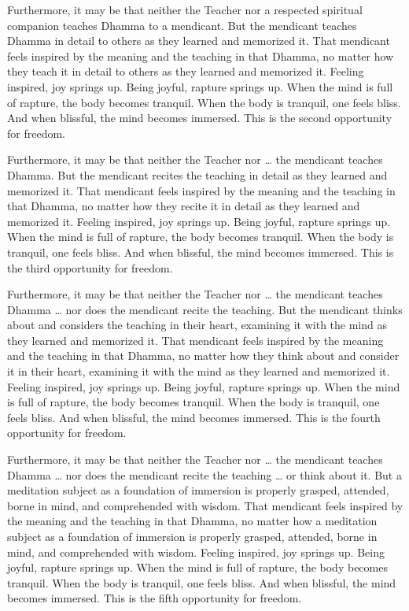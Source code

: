 \documentclass[12pt,openany]{book}%
\begin{document}
Furthermore, it may be that neither the Teacher nor a respected spiritual companion teaches Dhamma to a mendicant. But the mendicant teaches Dhamma in detail to others as they learned and memorized it. That mendicant feels inspired by the meaning and the teaching in that Dhamma, no matter how they teach it in detail to others as they learned and memorized it. Feeling inspired, joy springs up. Being joyful, rapture springs up. When the mind is full of rapture, the body becomes tranquil. When the body is tranquil, one feels bliss. And when blissful, the mind becomes immersed. This is the second opportunity for freedom. 

Furthermore, it may be that neither the Teacher nor … the mendicant teaches Dhamma. But the mendicant recites the teaching in detail as they learned and memorized it. That mendicant feels inspired by the meaning and the teaching in that Dhamma, no matter how they recite it in detail as they learned and memorized it. Feeling inspired, joy springs up. Being joyful, rapture springs up. When the mind is full of rapture, the body becomes tranquil. When the body is tranquil, one feels bliss. And when blissful, the mind becomes immersed. This is the third opportunity for freedom. 

Furthermore, it may be that neither the Teacher nor … the mendicant teaches Dhamma … nor does the mendicant recite the teaching. But the mendicant thinks about and considers the teaching in their heart, examining it with the mind as they learned and memorized it. That mendicant feels inspired by the meaning and the teaching in that Dhamma, no matter how they think about and consider it in their heart, examining it with the mind as they learned and memorized it. Feeling inspired, joy springs up. Being joyful, rapture springs up. When the mind is full of rapture, the body becomes tranquil. When the body is tranquil, one feels bliss. And when blissful, the mind becomes immersed. This is the fourth opportunity for freedom. 

Furthermore, it may be that neither the Teacher nor … the mendicant teaches Dhamma … nor does the mendicant recite the teaching … or think about it. But a meditation subject as a foundation of immersion is properly grasped, attended, borne in mind, and comprehended with wisdom. That mendicant feels inspired by the meaning and the teaching in that Dhamma, no matter how a meditation subject as a foundation of immersion is properly grasped, attended, borne in mind, and comprehended with wisdom. Feeling inspired, joy springs up. Being joyful, rapture springs up. When the mind is full of rapture, the body becomes tranquil. When the body is tranquil, one feels bliss. And when blissful, the mind becomes immersed. This is the fifth opportunity for freedom. 
\end{document}
